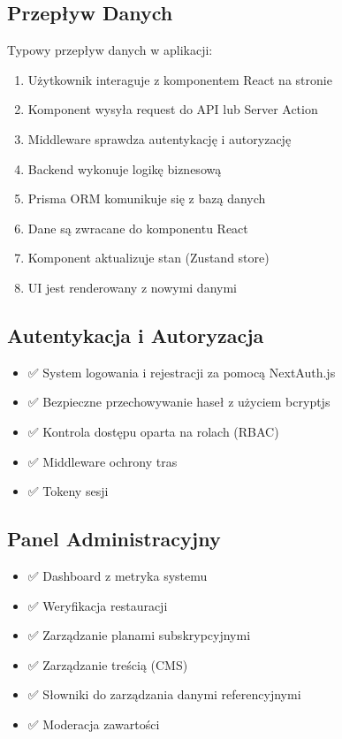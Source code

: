 \documentclass[12pt,a4paper,utf-8]{article}
\begin{document}
\subsection{Przepływ Danych}

Typowy przepływ danych w aplikacji:

\begin{enumerate}
    \item Użytkownik interaguje z komponentem React na stronie
    \item Komponent wysyła request do API lub Server Action
    \item Middleware sprawdza autentykację i autoryzację
    \item Backend wykonuje logikę biznesową
    \item Prisma ORM komunikuje się z bazą danych
    \item Dane są zwracane do komponentu React
    \item Komponent aktualizuje stan (Zustand store)
    \item UI jest renderowany z nowymi danymi
\end{enumerate}

\newpage

\subsection{Autentykacja i Autoryzacja}

\begin{itemize}
    \item ✅ System logowania i rejestracji za pomocą NextAuth.js
    \item ✅ Bezpieczne przechowywanie haseł z użyciem bcryptjs
    \item ✅ Kontrola dostępu oparta na rolach (RBAC)
    \item ✅ Middleware ochrony tras
    \item ✅ Tokeny sesji
\end{itemize}

\subsection{Panel Administracyjny}

\begin{itemize}
    \item ✅ Dashboard z metryka systemu
    \item ✅ Weryfikacja restauracji
    \item ✅ Zarządzanie planami subskrypcyjnymi
    \item ✅ Zarządzanie treścią (CMS)
    \item ✅ Słowniki do zarządzania danymi referencyjnymi
    \item ✅ Moderacja zawartości
\end{itemize}
\end{document}
